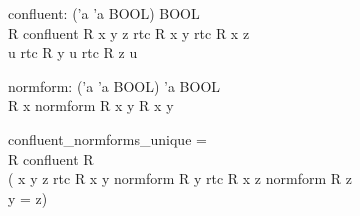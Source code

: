 \begin{HOLConst}
\+\PrNM{} \PrNL{}confluent\PrNN{}: ('a \MMM{\rightarrow} 'a  \MMM{\rightarrow} BOOL) \MMM{\rightarrow} BOOL\\
\PrPH{}\PrPM{}\PrPM{}\PrPM{}\PrPM{}\PrPM{}\PrPM{}\PrPM{}\PrPM{}\PrPM{}\PrPM{}\PrPM{}
\+\PrNM{} \MMM{\forall}R\MMM{\bullet} confluent R \MMM{\Leftrightarrow} \MMM{\forall}x y z\MMM{\bullet} rtc R x y \MMM{\land} rtc R x z \MMM{\Rightarrow}\\
\+\PrNM{}             \MMM{\exists}u\MMM{\bullet} rtc R y u \MMM{\land} rtc R z u\\
\end{HOLConst}

\begin{HOLConst}
\+\PrNM{} \PrNL{}normform\PrNN{}: ('a \MMM{\rightarrow} 'a  \MMM{\rightarrow} BOOL) \MMM{\rightarrow} 'a \MMM{\rightarrow}BOOL\\
\PrPH{}\PrPM{}\PrPM{}\PrPM{}\PrPM{}\PrPM{}\PrPM{}\PrPM{}\PrPM{}\PrPM{}\PrPM{}\PrPM{}
\+\PrNM{} \MMM{\forall}R x\MMM{\bullet} normform R x \MMM{\Leftrightarrow} \MMM{\forall}y\MMM{\bullet} \MMM{\lnot} R x y\\
\end{HOLConst}

\begin{GFT}{}
\+\PrNL{}confluent\_normforms\_unique\PrNN{} =\\
\+	\MMM{\Zthm} \MMM{\forall} R\MMM{\bullet} confluent R \MMM{\Rightarrow}\\
\+		(\MMM{\forall} x y z\MMM{\bullet} rtc R x y \MMM{\land} normform R y \MMM{\land} rtc R x z \MMM{\land} normform R z\\
\+		\MMM{\Rightarrow} y = z)\\
\end{GFT}

